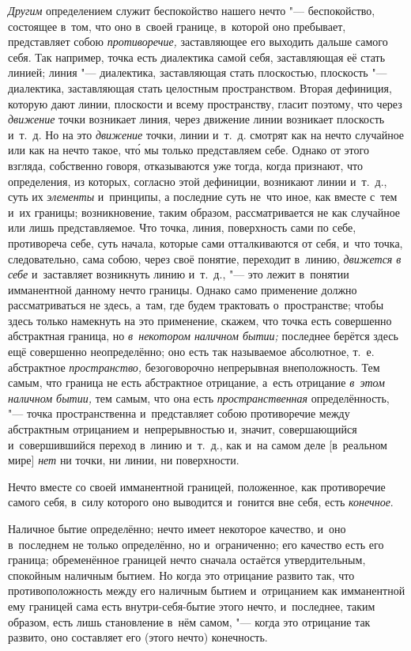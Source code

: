 {\em Другим} определением служит беспокойство нашего
нечто "--- беспокойство, состоящее в~том, что оно в~своей границе, в~которой
оно пребывает, представляет собою {\em противоречие,}
заставляющее его выходить дальше самого себя. Так например, точка есть
диалектика самой себя, заставляющая её стать линией; линия "--- диалектика,
заставляющая стать плоскостью, плоскость "--- диалектика, заставляющая стать
целостным пространством. Вторая дефиниция, которую дают линии, плоскости и
всему пространству, гласит поэтому, что через
{\em движение} точки возникает линия, через движение
линии возникает плоскость и~т.~д. Но на это
{\em движение} точки, линии и~т.~д. смотрят как на
нечто случайное или как на нечто такое, чт\'{о} мы только представляем себе.
Однако от этого взгляда, собственно говоря, отказываются уже тогда, когда
признают, что определения, из которых, согласно этой дефиниции, возникают
линии и~т.~д., суть их {\em элементы} и~принципы, а
последние суть не~что иное, как вместе с~тем и~их границы; возникновение,
таким образом, рассматривается не как случайное или лишь представляемое.
Что точка, линия, поверхность сами по себе, противореча себе, суть начала,
которые сами отталкиваются от себя, и~что точка, следовательно, сама собою,
через своё понятие, переходит в~линию, {\em движется в
себе} и~заставляет возникнуть линию и~т.~д., "--- это лежит в~понятии
имманентной данному нечто границы. Однако само применение должно
рассматриваться не здесь, а~там, где будем трактовать о~пространстве; чтобы
здесь только намекнуть на это применение, скажем, что точка есть совершенно
абстрактная граница, но {\em в~некотором наличном
бытии;} последнее берётся здесь ещё совершенно неопределённо; оно есть так
называемое абсолютное, т.~е. абстрактное
{\em пространство,} безоговорочно непрерывная
внеположность. Тем самым, что граница не есть абстрактное отрицание, а~есть
отрицание {\em в~этом наличном бытии,} тем самым, что
она есть {\em пространственная} определённость, "--- точка
пространственна и~представляет собою противоречие между абстрактным
отрицанием и~непрерывностью и, значит, совершающийся и~совершившийся
переход в~линию и~т.~д., как и~на самом деле [в~реальном мире]
{\em нет} ни точки, ни линии, ни поверхности.

Нечто вместе со своей имманентной границей, положенное, как противоречие
самого себя, в~силу которого оно выводится и~гонится вне себя, есть
{\em конечное}.


Наличное бытие определённо; нечто имеет некоторое качество, и~оно в~последнем
не только определённо, но и~ограниченно; его качество есть его граница;
обременённое границей нечто сначала остаётся утвердительным, спокойным
наличным бытием. Но когда это отрицание развито так, что противоположность
между его наличным бытием и~отрицанием как имманентной ему границей сама
есть внутри-себя-бытие этого нечто, и~последнее, таким образом, есть лишь
становление в~нём самом, "--- когда это отрицание так развито, оно составляет
его (этого нечто) конечность.


